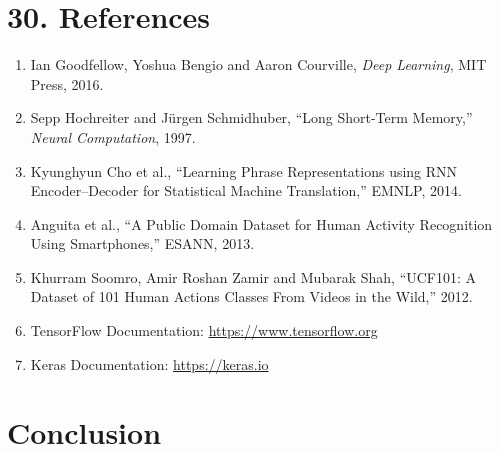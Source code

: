 \documentclass[10pt]{article}
\begin{document}
\section*{30. References}

\begin{enumerate}
\item Ian Goodfellow, Yoshua Bengio and Aaron Courville,
\emph{Deep Learning}, MIT Press, 2016.

\item Sepp Hochreiter and J\"urgen Schmidhuber,
``Long Short-Term Memory,'' \emph{Neural Computation}, 1997.

\item Kyunghyun Cho et al.,
``Learning Phrase Representations using RNN Encoder--Decoder for Statistical
Machine Translation,'' EMNLP, 2014.

\item Anguita et al.,
``A Public Domain Dataset for Human Activity Recognition Using Smartphones,''
ESANN, 2013.

\item Khurram Soomro, Amir Roshan Zamir and Mubarak Shah,
``UCF101: A Dataset of 101 Human Actions Classes From Videos in the Wild,''
2012.

\item TensorFlow Documentation:
\url{https://www.tensorflow.org}

\item Keras Documentation:
\url{https://keras.io}
\end{enumerate}

\section*{Conclusion}
\end{document}
